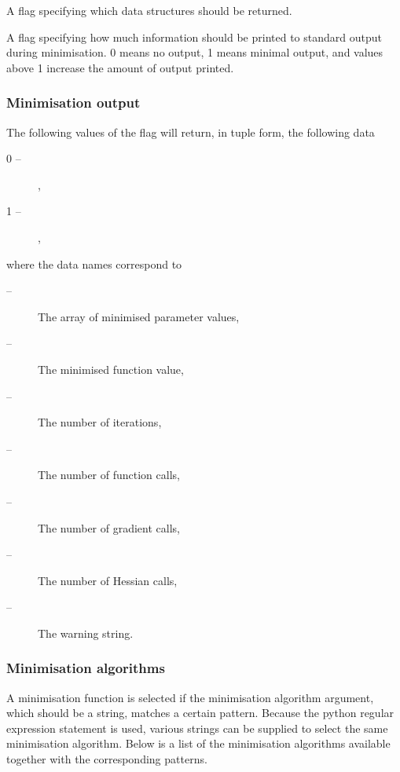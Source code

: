   A flag specifying which data structures should be returned.

  A flag specifying how much information should be printed to standard output during minimisation.  0 means no output, 1 means minimal output, and values above 1 increase the amount of output printed.

\subsubsection{Minimisation output}

The following values of the 
 flag will return, in tuple form, the following data

\begin{description}
\item[    0 --]   
,
\item[    1 --]   
,
\end{description}

where the data names correspond to

\begin{description}
\item[    
 --]       The array of minimised parameter values,
\item[    
 --]       The minimised function value,
\item[    
 --]        The number of iterations,
\item[    
 --]  The number of function calls,
\item[    
 --]  The number of gradient calls,
\item[    
 --]  The number of Hessian calls,
\item[    
 --]  The warning string.
\end{description}


\subsubsection{Minimisation algorithms}

A minimisation function is selected if the minimisation algorithm argument, which should be a
string, matches a certain pattern.  Because the python regular expression 
 statement is
used, various strings can be supplied to select the same minimisation algorithm.  Below is a
list of the minimisation algorithms available together with the corresponding patterns.


